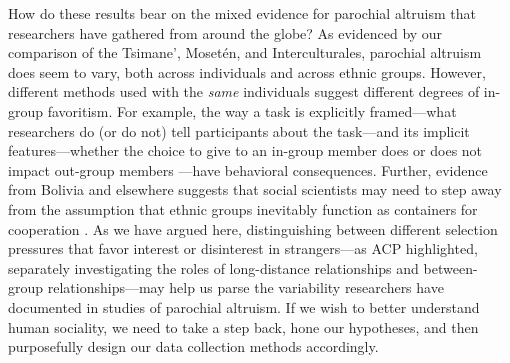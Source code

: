 \documentclass[bibauthoryear]{aa}
\begin{document}
	How do these results bear on the mixed evidence for parochial altruism that researchers have gathered from around the globe? As evidenced by our comparison of the Tsimane', Moset\'en, and Interculturales, parochial altruism does seem to vary, both across individuals and across ethnic groups. However, different methods used with the \emph{same} individuals suggest different degrees of in-group favoritism. For example, the way a task is explicitly framed---what researchers do (or do not) tell participants about the task---and its implicit features---whether the choice to give to an in-group member does or does not impact out-group members \citep{hagen2006game, lightner2017, Pisor2020}---have behavioral consequences. 
	Further, evidence from Bolivia and elsewhere suggests that social scientists may need to step away from the assumption that ethnic groups inevitably function as containers for cooperation \citep{moya2015different}. As we have argued here, distinguishing between different selection pressures that favor interest or disinterest in strangers---as ACP highlighted, separately investigating the roles of long-distance relationships and  between-group relationships---may help us parse the variability researchers have documented in studies of parochial altruism. If we wish to better understand human sociality, we need to take a step back, hone our hypotheses, and then purposefully design our data collection methods accordingly.
\end{document}
